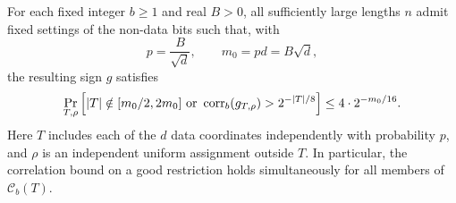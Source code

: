 \begin{proposition}\label{prop:good-slices}
For each fixed integer $b\ge1$ and real $B>0$, all sufficiently large
lengths $n$ admit fixed settings of the non-data bits such that, with
\[
 p=\frac{B}{\sqrt d},\qquad m_0=pd=B\sqrt d,
\]
the resulting sign $g$ satisfies
\begin{equation}\label{eq:good-slices}
 \Pr_{T,\rho}\left[
 |T|\notin[m_0/2,2m_0]
 \ \text{or}\ 
 \corr_b(g_{T,\rho})>2^{-|T|/8}
 \right]
 \le4\cdot2^{-m_0/16}.
\end{equation}
Here $T$ includes each of the $d$ data coordinates independently with
probability $p$, and $\rho$ is an independent uniform assignment outside
$T$.  In particular, the correlation bound on a good restriction holds
simultaneously for all members of $\mathcal C_b(T)$.
\end{proposition}

